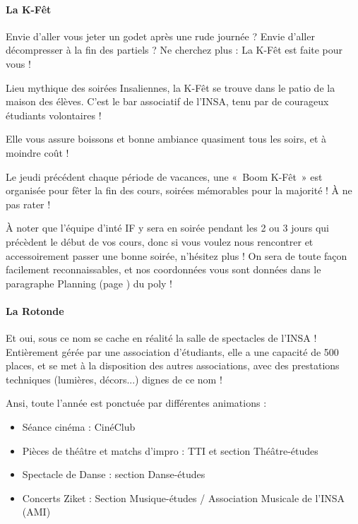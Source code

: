 \paragraph{La K-Fêt}
Envie d'aller vous jeter un godet après une rude journée ? Envie d'aller
décompresser à la fin des partiels ? Ne cherchez plus : La K-Fêt est faite
pour vous !

\vspace{1em}

Lieu mythique des soirées Insaliennes, la K-Fêt se trouve dans le patio de
la maison des élèves. C'est le bar associatif de l'INSA, tenu par de courageux
étudiants volontaires !

\vspace{1em}

Elle vous assure boissons et bonne ambiance quasiment tous les soirs, et à
moindre coût !

\vspace{1em}

Le jeudi précédent chaque période de vacances, une «~Boom K-Fêt~» est organisée
pour fêter la fin des cours, soirées mémorables pour la majorité ! À ne
pas rater !

\vspace{1em}

À noter que l'équipe d'inté IF y sera en soirée pendant les 2 ou 3 jours qui
précèdent le début de vos cours, donc si vous voulez nous rencontrer et
accessoirement passer une bonne soirée, n'hésitez plus ! On sera de toute façon
facilement reconnaissables, et nos coordonnées vous sont données dans le
paragraphe Planning (page \pageref{rplanning}) du poly !

\paragraph{La Rotonde}
Et oui, sous ce nom se cache en réalité la salle de spectacles de l'INSA !
Entièrement gérée par une association d'étudiants, elle a une
capacité de 500 places, et se met à la disposition des autres associations, avec
des prestations techniques (lumières, décors...) dignes de ce nom !

\vspace{1em}

Ansi, toute l'année est ponctuée par différentes animations :
\begin{itemize}
\item  Séance cinéma : CinéClub
\item  Pièces de théâtre et matchs d'impro : TTI et section Théâtre-études
\item  Spectacle de Danse : section Danse-études
\item  Concerts Ziket : Section Musique-études / Association Musicale de l'INSA (AMI) 
\end{itemize}

